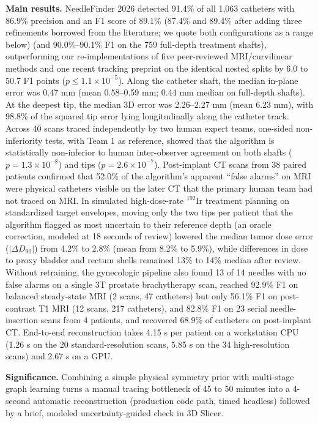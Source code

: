 \documentclass[
  11pt,
]{article}
\newcommand{\nfcaps}[1]{{\nfcapsfont #1}}
\renewenvironment{abstract}
  {\par\noindent{\small\nfcaps{Abstract}}\par\vspace{0.4\baselineskip}%
   \begingroup\small\setlength{\parindent}{0pt}\setlength{\parskip}{0.45\baselineskip}}
  {\par\endgroup
   \vspace{0.9\baselineskip}%
   \noindent{\color{nfrule}\rule{\linewidth}{0.4pt}}\par\vspace{0.4\baselineskip}}
\begin{document}
\begin{abstract}
\textbf{Main results.} NeedleFinder 2026 detected 91.4\% of all 1,063
catheters with 86.9\% precision and an F1 score of 89.1\% (87.4\% and
89.4\% after adding three refinements borrowed from the literature; we
quote both configurations as a range below) (and 90.0\%--90.1\% F1 on
the 759 full-depth treatment shafts), outperforming our
re-implementations of five peer-reviewed MRI/curvilinear methods and one
recent tracking preprint on the identical nested splits by 6.0 to 50.7
F1 points (\(p \le 1.1 \times 10^{-5}\)). Along the catheter shaft, the
median in-plane error was 0.47 mm (mean 0.58--0.59 mm; 0.44 mm median on
full-depth shafts). At the deepest tip, the median 3D error was
2.26--2.27 mm (mean 6.23 mm), with 98.8\% of the squared tip error lying
longitudinally along the catheter track. Across 40 scans traced
independently by two human expert teams, one-sided non-inferiority
tests, with Team 1 as reference, showed that the algorithm is
statistically non-inferior to human inter-observer agreement on both
shafts (\(p = 1.3 \times 10^{-8}\)) and tips
(\(p = 2.6 \times 10^{-7}\)). Post-implant CT scans from 38 paired
patients confirmed that 52.0\% of the algorithm's apparent ``false
alarms'' on MRI were physical catheters visible on the later CT that the
primary human team had not traced on MRI. In simulated high-dose-rate
\(^{192}\text{Ir}\) treatment planning on standardized target envelopes,
moving only the two tips per patient that the algorithm flagged as most
uncertain to their reference depth (an oracle correction, modeled at 18
seconds of review) lowered the median tumor dose error
(\(|\Delta D_{90}|\)) from 4.2\% to 2.8\% (mean from 8.2\% to 5.9\%),
while differences in dose to proxy bladder and rectum shells remained
13\% to 14\% median after review. Without retraining, the gynecologic
pipeline also found 13 of 14 needles with no false alarms on a single 3T
prostate brachytherapy scan, reached 92.9\% F1 on balanced steady-state
MRI (2 scans, 47 catheters) but only 56.1\% F1 on post-contrast T1 MRI
(12 scans, 217 catheters), and 82.8\% F1 on 23 serial needle-insertion
scans from 4 patients, and recovered 68.9\% of catheters on post-implant
CT. End-to-end reconstruction takes 4.15 s per patient on a workstation
CPU (1.26 s on the 20 standard-resolution scans, 5.85 s on the 34
high-resolution scans) and 2.67 s on a GPU.

\textbf{Significance.} Combining a simple physical symmetry prior with
multi-stage graph learning turns a manual tracing bottleneck of 45 to 50
minutes into a 4-second automatic reconstruction (production code path,
timed headless) followed by a brief, modeled uncertainty-guided check in
3D Slicer.
\end{abstract}
\end{document}
